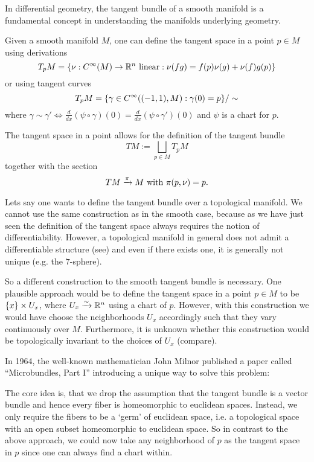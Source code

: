 \begin{myparagraph}
    In differential geometry,
    the tangent bundle of a smooth manifold
    is a fundamental concept in understanding the manifolds underlying geometry.
    
    Given a smooth manifold $M$,
    one can define the tangent space
    in a point $p \in M$ using derivations
    \[
        T_p M = \{\nu: C^\infty(M) \to \mathbb{R}^n \text{ linear}:\nu(fg)
        = f(p)\nu(g) + \nu(f)g(p)\}
    \]    
    or using tangent curves
    \[ T_p M = \{\gamma \in C^\infty((-1, 1), M):\gamma(0) = p \} / \sim \]
    where $\gamma \sim \gamma' \iff \frac{d}{dx}(\psi \circ \gamma)(0) = \frac{d}{dx}(\psi \circ \gamma')(0)$
    and $\psi$ is a chart for $p$.
    
    The tangent space in a point allows for the definition of the tangent bundle
    \[ TM := \bigsqcup_{p \in M} T_p M\]
    together with the section
    \[ TM \xrightarrow{\pi} M \text{ with } \pi(p, \nu) = p. \]

    Lets say one wants to define the tangent bundle over a topological manifold.
    We cannot use the same construction as in the smooth case, because
    as we have just seen the definition of
    the tangent space always requires the notion of differentiability.
    However, a topological manifold in general
    does not admit a differentiable structure (see\cite{kervaire})
    and even if there exists one,
    it is generally not unique (e.g. the $7$-sphere\cite{milnor7sphere}).

    So a different construction to the smooth tangent bundle is necessary.
    One plausible approach would be to define the tangent space in a point $p \in M$
    to be $\{x\} \times U_x$, where $U_x \xrightarrow{\sim} \mathbb{R}^n$ using a chart of $p$.
    However, with this construction we would have choose the neighborhoods $U_x$
    accordingly such that they vary continuously over $M$.
    Furthermore, it is unknown whether this construction would be topologically
    invariant to the choices of $U_x$ (compare\cite[p.53]{milnor}).

    In 1964,
    the well-known mathematician John Milnor
    published a paper called ``Microbundles, Part I''
    introducing a unique way to solve this problem:

    The core idea is, that we drop the assumption
    that the tangent bundle is a vector bundle and hence
    every fiber is homeomorphic to euclidean spaces.
    Instead, we only require the fibers to be a `germ' of euclidean space,
    i.e. a topological space with an open subset homeomorphic to euclidean space.
    So in contrast to the above approach,
    we could now take any neighborhood of $p$ as the tangent space in $p$ since
    one can always find a chart within.


\end{myparagraph}
